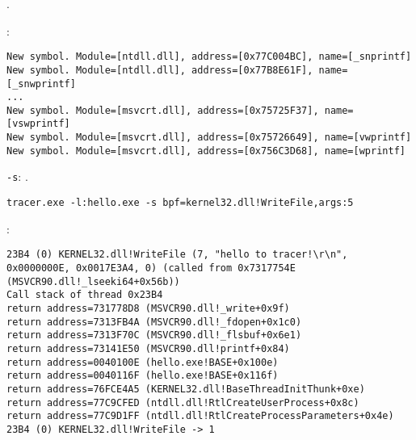  .

 :

\begin{lstlisting}
New symbol. Module=[ntdll.dll], address=[0x77C004BC], name=[_snprintf]
New symbol. Module=[ntdll.dll], address=[0x77B8E61F], name=[_snwprintf]
...
New symbol. Module=[msvcrt.dll], address=[0x75725F37], name=[vswprintf]
New symbol. Module=[msvcrt.dll], address=[0x75726649], name=[vwprintf]
New symbol. Module=[msvcrt.dll], address=[0x756C3D68], name=[wprintf]
\end{lstlisting}

\verb|-s|: .

\forexample{}

\verb|tracer.exe -l:hello.exe -s bpf=kernel32.dll!WriteFile,args:5|

:

\begin{lstlisting}
23B4 (0) KERNEL32.dll!WriteFile (7, "hello to tracer!\r\n", 0x0000000E, 0x0017E3A4, 0) (called from 0x7317754E (MSVCR90.dll!_lseeki64+0x56b))
Call stack of thread 0x23B4
return address=731778D8 (MSVCR90.dll!_write+0x9f)
return address=7313FB4A (MSVCR90.dll!_fdopen+0x1c0)
return address=7313F70C (MSVCR90.dll!_flsbuf+0x6e1)
return address=73141E50 (MSVCR90.dll!printf+0x84)
return address=0040100E (hello.exe!BASE+0x100e)
return address=0040116F (hello.exe!BASE+0x116f)
return address=76FCE4A5 (KERNEL32.dll!BaseThreadInitThunk+0xe)
return address=77C9CFED (ntdll.dll!RtlCreateUserProcess+0x8c)
return address=77C9D1FF (ntdll.dll!RtlCreateProcessParameters+0x4e)
23B4 (0) KERNEL32.dll!WriteFile -> 1
\end{lstlisting}



